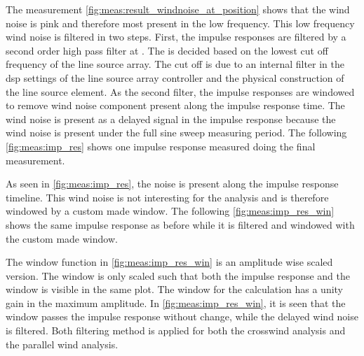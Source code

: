The measurement \autoref{fig:meas:result_windnoise_at_position} shows that the wind noise is pink and therefore most present in the low frequency. This low frequency wind noise is filtered in two steps. First, the impulse responses are filtered by a second order high pass filter at .  The  is decided based on the lowest cut off frequency of the line source array. The cut off is due to an internal filter in the \gls{dsp} settings of the line source array controller and the physical construction of the line source element. As the second filter, the impulse responses are windowed to remove wind noise component present along the impulse response time. The wind noise is present as a delayed signal in the impulse response because the wind noise is present under the full sine sweep measuring period. The following \autoref{fig:meas:imp_res} shows one impulse response measured doing the final measurement.



As seen in \autoref{fig:meas:imp_res}, the noise is present along the impulse response timeline. This wind noise is not interesting for the analysis and is therefore windowed by a custom made window. The following \autoref{fig:meas:imp_res_win} shows the same impulse response as before while it is filtered and windowed with the custom made window.



The window function in \autoref{fig:meas:imp_res_win} is an amplitude wise scaled version. The window is only scaled such that both the impulse response and the window is visible in the same plot. The window for the calculation has a unity gain in the maximum amplitude. In \autoref{fig:meas:imp_res_win}, it is seen that the window passes the impulse response without change, while the delayed wind noise is filtered. Both filtering method is applied for both the crosswind analysis and the parallel wind analysis. 

